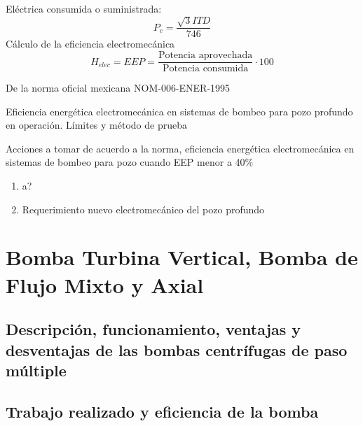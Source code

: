 Eléctrica consumida o suministrada:
\begin{equation}
    P_c = \frac{\sqrt{3} IT D}{746} 
\end{equation}
Cálculo de la eficiencia electromecánica
\begin{equation}
    H_{elec} = EEP= \frac{\text{Potencia aprovechada}}{\text{Potencia consumida}} \cdot  100
\end{equation}

De la norma oficial mexicana NOM-006-ENER-1995

Eficiencia energética electromecánica en sistemas de bombeo para pozo profundo en operación. Límites y método de prueba

Acciones a tomar de acuerdo a la norma, eficiencia energética electromecánica en sistemas de bombeo para pozo cuando EEP menor a 40\%
\begin{enumerate}
    \item a?
    \item Requerimiento nuevo electromecánico del pozo profundo
\end{enumerate}

\section{Bomba Turbina Vertical, Bomba de Flujo Mixto y Axial}










\subsection{Descripción, funcionamiento, ventajas y desventajas de las bombas centrífugas de paso múltiple}

\subsection{Trabajo realizado y eficiencia de la bomba}















































